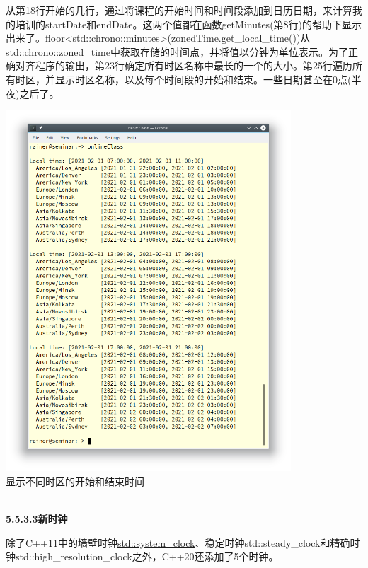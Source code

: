 从第18行开始的几行，通过将课程的开始时间和时间段添加到日历日期，来计算我的培训的startDate和endDate。这两个值都在函数getMinutes(第8行)的帮助下显示出来了。floor<std::chrono::minutes>(zonedTime.get\_local\_time())从std::chrono::zoned\_time中获取存储的时间点，并将值以分钟为单位表示。为了正确对齐程序的输出，第23行确定所有时区名称中最长的一个的大小。第25行遍历所有时区，并显示时区名称，以及每个时间段的开始和结束。一些日期甚至在0点(半夜)之后了。

\begin{center}
\includegraphics[width=0.8\textwidth]{content/3/chapter5/images/28.png}\\
显示不同时区的开始和结束时间
\end{center}


\hspace*{\fill} \\ %
\noindent
\textbf{5.5.3.3\hspace{0.2cm}新时钟}

除了C++11中的墙壁时钟\href{https://www.modernescpp.com/index.php/the-three-clocks}{std::system\_clock}、稳定时钟std::steady\_clock和精确时钟std::high\_resolution\_clock之外，C++20还添加了5个时钟。

